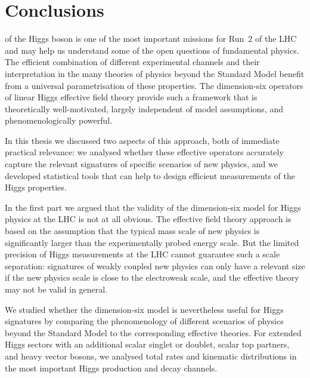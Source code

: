 
 
\chapter{Conclusions}
\label{chapter:conclusions}

 of the Higgs boson is one of
the most important missions for Run~2 of the LHC and may help us
understand some of the open questions of fundamental physics. The
efficient combination of different experimental channels and their
interpretation in the many theories of physics beyond the Standard Model
benefit from a universal parametrisation of these properties. The
dimension-six operators of linear Higgs effective field theory provide
such a framework that is theoretically well-motivated, largely
independent of model assumptions, and phenomenologically powerful.

In this thesis we discussed two aspects of this approach, both of
immediate practical relevance: we analysed whether these effective
operators accurately capture the relevant signatures of specific
scenarios of new physics, and we developed statistical tools that can
help to design efficient measurements of the Higgs properties.

\newparagraph
%
In the first part we argued that the validity of the dimension-six
model for Higgs physics at the LHC is not at all obvious. The
effective field theory approach is based on the assumption that the
typical mass scale of new physics is significantly larger than the
experimentally probed energy scale. But the limited precision of Higgs
measurements at the LHC cannot guarantee such a scale separation:
signatures of weakly coupled new physics can only have a relevant size
if the new physics scale is close to the electroweak scale, and the
effective theory may not be valid in general.

We studied whether the dimension-six model is nevertheless useful for
Higgs signatures
by comparing the phenomenology of different scenarios of physics
beyond the Standard Model to the corresponding effective theories. For
extended Higgs sectors with an additional scalar singlet or doublet,
scalar top partners, and heavy vector bosons, we analysed total rates
and kinematic distributions in the most important Higgs production and
decay channels.

